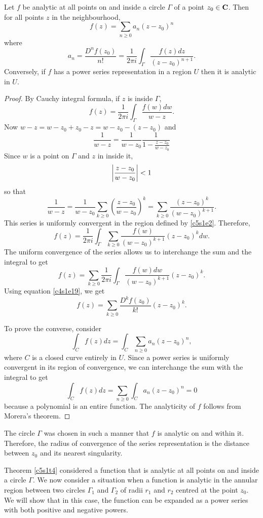 \begin{thm}\label{c5s1t4}
Let $f$ be analytic at all points on and inside a circle $\Gamma$ of a point 
$z_0 \in \mathbf{C}$. Then for all points $z$ in the neighbourhood,
\[
f(z) = \sum_{n \ge 0} a_n(z - z_0)^n
\]
where 
\[
a_n=\frac{D^nf(z_0)}{n!}=
\frac{1}{2\pi i}\int_\Gamma\frac{f(z)dz}{(z-z_0)^{n+1}}.
\]
Conversely, if $f$ has a power series representation in a region $U$ then it
is analytic in $U$.
\end{thm}
\begin{proof}
By Cauchy integral formula, if $z$ is inside $\Gamma$,
\[
f(z) = \frac{1}{2\pi i}\int_\Gamma \frac{f(w)dw}{w - z}.
\]
Now $w - z = w - z_0 + z_0 - z = w - z_0 - (z - z_0)$ and
\[
\frac{1}{w-z} = \frac{1}{w-z_0}\frac{1}{1 - \frac{z - z_0}{w - z_0}}
\]
Since $w$ is a point on $\Gamma$ and $z$ in inside it, 
\begin{equation}\label{c5s1e2}
\left\vert{\frac{z - z_0}{w - z_0}}\right\vert < 1
\end{equation}
so that 
\[
\frac{1}{w-z} = \frac{1}{w-z_0}\sum_{k \ge 0}\left(\frac{z-z_0}{w-z_0}\right)^k
= \sum_{k \ge 0}\frac{(z - z_0)^k}{(w - z_0)^{k+1}}.
\]
This series is uniformly convergent in the region defined by \eqref{c5s1e2}.
Therefore,
\[
f(z) = \frac{1}{2\pi i}\int_\Gamma\sum_{k \ge 0}\frac{f(w)}{(w - z_0)^{k+1}}
(z - z_0)^k dw.
\]
The uniform convergence of the series allows us to interchange the sum and the
integral to get
\[
f(z) = \sum_{k \ge 0}\frac{1}{2\pi i}\int_\Gamma \frac{f(w)dw}{(w-z_0)^{k+1}}
(z - z_0)^k.
\]
Using equation \eqref{c4s1e19}, we get
\[
f(z) = \sum_{k \ge 0}\frac{D^k f(z_0)}{k!}(z - z_0)^k.
\]

To prove the converse, consider
\[
\int_C f(z)dz = \int_C\sum_{n\ge 0} a_n(z - z_0)^n,
\]
where $C$ is a closed curve entirely in $U$. Since a power series is uniformly
convergent in its region of convergence, we can interchange the sum with the
integral to get
\[
\int_C f(z)dz = \sum_{n\ge 0} \int_C a_n(z - z_0)^n = 0
\]
because a polynomial is an entire function. The analyticity of $f$ follows 
from Morera's theorem.
\end{proof}

\begin{rem}
The circle $\Gamma$ was chosen in such a manner that $f$ is analytic on and
within it. Therefore, the radius of convergence of the series representation is
the distance between $z_0$ and its nearest singularity.
\end{rem}

Theorem \ref{c5s1t4} considered a function that is analytic at all points on
and inside a circle $\Gamma$. We now consider a situation when a function is
analytic in the annular region between two circles $\Gamma_1$ and $\Gamma_2$
of radii $r_1$ and $r_2$ centred at the point $z_0$. We will show that in
this case, the function can be expanded as a power series with both positive
and negative powers.

